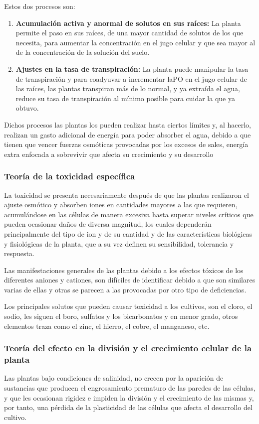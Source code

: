 Estos dos procesos son:
\begin{enumerate}
    \item \textbf{Acumulación activa y anormal de solutos en sus raíces:} La planta permite el paso en sus raíces, de una mayor cantidad de solutos de los que necesita, para aumentar la concentración en el jugo celular y que sea mayor al de la concentración de la solución del suelo.
    \item \textbf{Ajustes en la tasa de transpiración:} La planta puede manipular la tasa de transpiración y para coadyuvar a incrementar laPO en el jugo celular de las raíces, las plantas transpiran más de lo normal, y ya extraída el agua, reduce su tasa de transpiración al mínimo posible para cuidar la que ya obtuvo.
\end{enumerate}
Dichos procesos las plantas los pueden realizar hasta ciertos límites y, al hacerlo, realizan un gasto adicional de energía para poder absorber el agua, debido a que tienen que vencer fuerzas osmóticas provocadas por los excesos de sales, energía extra enfocada a sobrevivir que afecta su crecimiento y su desarrollo

\subsubsection{Teoría de la toxicidad específica}
La toxicidad se presenta necesariamente después de que las plantas realizaron el ajuste osmótico y absorben iones en cantidades mayores a las que requieren, acumulándose en las células de manera excesiva hasta superar niveles críticos que pueden ocasionar daños de diversa magnitud, los cuales dependerán principalmente del tipo de ion y de su cantidad y de las características biológicas y fisiológicas de la planta, que a su vez definen su sensibilidad, tolerancia y respuesta.

Las manifestaciones generales de las plantas debido a los efectos tóxicos de los diferentes aniones y cationes, son difíciles de identificar debido a que son similares varias de ellas y otras se parecen a las provocadas por otro tipo de deficiencias.

Los principales solutos que pueden causar toxicidad a los cultivos, son el cloro, el sodio, les siguen el boro, sulfatos y los bicarbonatos y en menor grado, otros elementos traza como el zinc, el hierro, el cobre, el manganeso, etc.

\subsubsection{Teoría del efecto en la división y el crecimiento celular de la planta}
Las plantas bajo condiciones de salinidad, no crecen por la aparición de sustancias que producen el engrosamiento prematuro de las paredes de las células, y que les ocasionan rigidez e impiden la división y el crecimiento de las mismas y, por tanto, una pérdida de la plasticidad de las células que afecta el desarrollo del cultivo.

